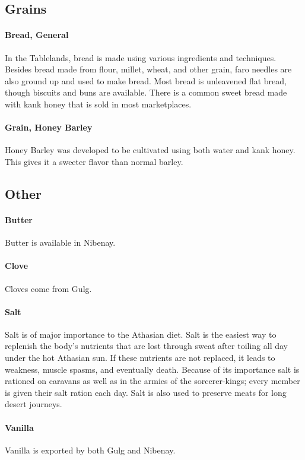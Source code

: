 \begin{multicols}{2}

\subsection{Grains}

\paragraph{Bread, General} In the Tablelands, bread is made using various ingredients and techniques. Besides bread made from flour, millet, wheat, and other grain, faro needles are also ground up and used to make bread. Most bread is unleavened flat bread, though biscuits and buns are available. There is a common sweet bread made with kank honey that is sold in most marketplaces.\\
\paragraph{Grain, Honey Barley} Honey Barley was developed to be cultivated using both water and kank honey. This gives it a sweeter flavor than normal barley.\\

\subsection{Other}

\paragraph{Butter} Butter is available in Nibenay.\\
\paragraph{Clove} Cloves come from Gulg.\\
\paragraph{Salt} Salt is of major importance to the Athasian diet. Salt is the easiest way to replenish the body's nutrients that are lost through sweat after toiling all day under the hot Athasian sun. If these nutrients are not replaced, it leads to weakness, muscle spasms, and eventually death. Because of its importance salt is rationed on caravans as well as in the armies of the sorcerer-kings; every member is given their salt ration each day. Salt is also used to preserve meats for long desert journeys.\\
\paragraph{Vanilla} Vanilla is exported by both Gulg and Nibenay.\\

\end{multicols}
